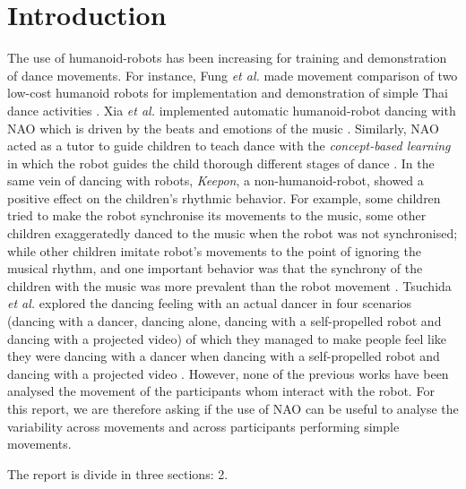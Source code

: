 \documentclass{sig-alternate-05-2015}
\begin{document}
\section{Introduction}
The use of humanoid-robots has been increasing for training and demonstration of dance movements.
For instance, Fung \textit{et al.} made movement comparison of 
two low-cost humanoid robots for implementation and demonstration of 
simple Thai dance activities  \cite{Fung2008}. 
Xia \textit{et al.} implemented automatic humanoid-robot dancing with NAO
which is driven by the beats and emotions of the music \cite{Xia2012}.
Similarly, NAO acted as a tutor to guide children to teach dance with the 
\textit{concept-based learning} in which the robot guides the child 
thorough different stages of dance \cite{Ros2013,Ros2014}.
In the same vein of dancing with robots, \textit{Keepon}, a non-humanoid-robot, 
showed a positive effect on the children's rhythmic behavior.
For example,
some children tried to make the robot synchronise its movements to the music,
some other children exaggeratedly danced to the music when the robot was not 
synchronised; while other children imitate robot's movements to the point
of ignoring the musical rhythm, and one important behavior was that the
synchrony of the children with the music was more prevalent than the robot movement \cite{Michalowski2007}.
Tsuchida \textit{et al.} explored the dancing feeling with an actual dancer in four scenarios 
(dancing with a dancer, dancing alone, dancing with a self-propelled robot
and dancing with a projected video) of which they managed to make
people feel like they were dancing with a dancer
when dancing with a self-propelled robot and dancing with a projected video \cite{Tsuchida2013}.
However, none of the previous works have been analysed the movement of the participants 
whom interact with the robot. For this report, we are therefore asking if the use 
of NAO can be useful to analyse the variability across movements 
and across participants performing simple movements.

The report is divide in three sections: 2. 
\end{document}
